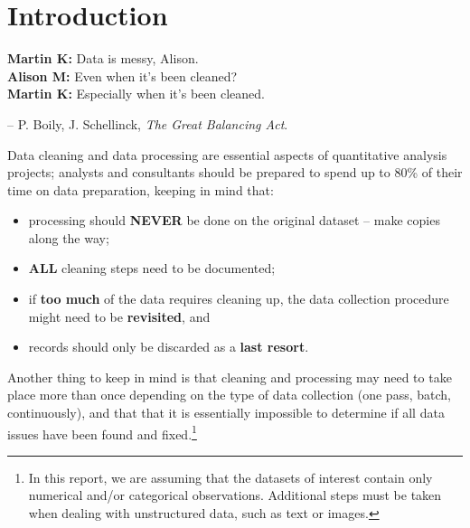 \section{Introduction}\label{sec:DP}
\begin{tcolorbox}[title=Data Validation]
\textbf{Martin K:} Data is messy, Alison.  \\ 
\textbf{Alison M:} Even when it's been cleaned?  \\ 
\textbf{Martin K:} Especially when it's been cleaned.\\[-0.6cm]
\begin{flushright}
-- P. Boily, J. Schellinck, \textit{The Great Balancing Act}.
\end{flushright}
\end{tcolorbox}
\noindent
Data cleaning and data processing are essential aspects of quantitative analysis projects; analysts and consultants should be prepared to spend up to 80\% of their time on data preparation,  keeping in mind that:
\begin{itemize}[noitemsep]
\item processing should \textbf{NEVER} be done on the original dataset -- make copies along the way;
\item {\textbf{ALL}} cleaning steps need to be documented;
\item if \textbf{too much} of the data requires cleaning up, the data collection procedure might need to be \textbf{revisited}, and 
\item records should only be discarded as a \textbf{last resort}.
\end{itemize}
Another thing to keep in mind is that cleaning and processing may need to take place more than once depending on the type of data collection (one pass, batch, continuously), and that that it is essentially impossible to determine if all data issues have been found and fixed.\footnote{In this report, we are assuming that the datasets of interest contain only numerical and/or categorical observations. Additional steps must be taken when dealing with unstructured data, such as text or images.}
\newpage

